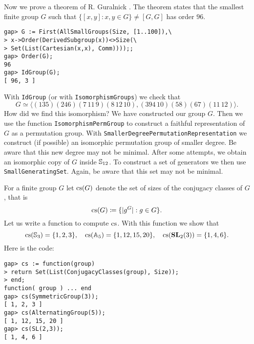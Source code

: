 \begin{example}
\label{exa:Guralnick:96}
Now we prove a theorem of R. Guralnick \cite{MR673806}. The theorem states
that the smallest finite group $G$ such that $\{[x,y]:x,y\in G\}\ne[G,G]$ has
order $96$.
\begin{lstlisting}
gap> G := First(AllSmallGroups(Size, [1..100]),\
> x->Order(DerivedSubgroup(x))<>Size(\
> Set(List(Cartesian(x,x), Comm))));;
gap> Order(G);
96
gap> IdGroup(G);
[ 96, 3 ]
\end{lstlisting}
With \lstinline{IdGroup} (or with \lstinline{IsomorphismGroups}) we check that 
\[
G\simeq\langle (135)(246)(7\,11\,9)(8\,12\,10),(394\,10)(58)(67)(11\,12)\rangle.
\]
How did we find this isomorphism? %
We have constructed our group $G$.  Then we use the function \lstinline{IsomorphismPermGroup} to
construct a faithful representation of $G$ as a permutation group. With
\lstinline{SmallerDegreePermutationRepresentation} we construct (if possible) an isomorphic
permutation group of smaller degree. Be aware that this new degree may not be minimal.
After some attempts, we obtain 
an isomorphic copy of $G$ inside $\mathbb{S}_{12}$. To construct a set of generators we then use 
\lstinline{SmallGeneratingSet}. Again, be aware that this set may not be minimal.
\end{example}




For a finite group $G$ let $\operatorname{cs}(G)$ denote the set of sizes of the conjugacy
classes of $G$, that is
\[
\operatorname{cs}(G)\coloneqq \{|g^G|:g\in G\}.
\]  Let us write a function to compute $\operatorname{cs}$. With this function
we show that
  \[
    \operatorname{cs}(\mathbb{S}_3)=\{1,2,3\},
    \quad
    \operatorname{cs}(\mathbb{A}_5)=\{1,12,15,20\},
    \quad
    \operatorname{cs}(\mathbf{SL}_2(3))=\{1,4,6\}.
  \]
Here is the code:
\begin{lstlisting}
gap> cs := function(group)
> return Set(List(ConjugacyClasses(group), Size));
> end;
function( group ) ... end
gap> cs(SymmetricGroup(3));
[ 1, 2, 3 ]
gap> cs(AlternatingGroup(5));
[ 1, 12, 15, 20 ]
gap> cs(SL(2,3));
[ 1, 4, 6 ]
\end{lstlisting}

